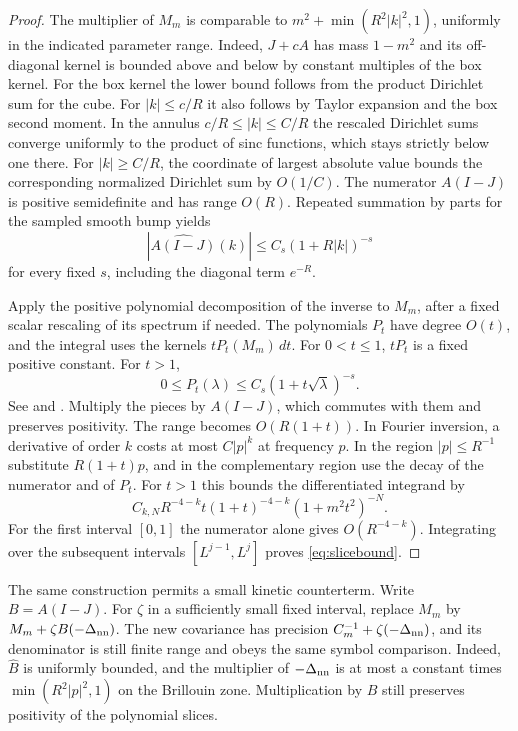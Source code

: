 \documentclass[11pt]{article}
\begin{document}
\begin{proof}
The multiplier of \(M_m\) is comparable to
\(m^2+\min(R^2|k|^2,1)\), uniformly in the indicated parameter range. Indeed, \(J+cA\) has mass \(1-m^2\) and its off-diagonal kernel is bounded above and below by constant multiples of the box kernel. For the box kernel the lower bound follows from the product Dirichlet sum for the cube. For \(|k|\le c/R\) it also follows by Taylor expansion and the box second moment. In the annulus \(c/R\le |k|\le C/R\) the rescaled Dirichlet sums converge uniformly to the product of sinc functions, which stays strictly below one there. For \(|k|\ge C/R\), the coordinate of largest absolute value bounds the corresponding normalized Dirichlet sum by \(O(1/C)\). The numerator \(A(I-J)\) is positive semidefinite and has range \(O(R)\). Repeated summation by parts for the sampled smooth bump yields
\[
 |\widehat{A(I-J)}(k)|\le C_s(1+R|k|)^{-s}
\]
for every fixed \(s\), including the diagonal term \(e^{-R}\).

Apply the positive polynomial decomposition of the inverse to \(M_m\), after a fixed scalar rescaling of its spectrum if needed. The polynomials \(P_t\) have degree \(O(t)\), and the integral uses the kernels \(tP_t(M_m)\,dt\). For \(0<t\le1\), \(tP_t\) is a fixed positive constant. For \(t>1\),
\[
 0\le P_t(\lambda)\le C_s(1+t\sqrt\lambda)^{-s}.
\]
See \cite[Lemma 2.7]{Bauerschmidt} and \cite[Lemma 3.8]{BPR}. Multiply the pieces by \(A(I-J)\), which commutes with them and preserves positivity. The range becomes \(O(R(1+t))\). In Fourier inversion, a derivative of order \(k\) costs at most \(C|p|^k\) at frequency \(p\). In the region \(|p|\le R^{-1}\) substitute \(R(1+t)p\), and in the complementary region use the decay of the numerator and of \(P_t\). For \(t>1\) this bounds the differentiated integrand by
\[
 C_{k,N}R^{-4-k}t(1+t)^{-4-k}(1+m^2t^2)^{-N}.
\]
For the first interval \([0,1]\) the numerator alone gives \(O(R^{-4-k})\). Integrating over the subsequent intervals \([L^{j-1},L^j]\) proves \eqref{eq:slicebound}.
\end{proof}


The same construction permits a small kinetic counterterm. Write
\(B=A(I-J)\). For \(\zeta\) in a sufficiently small fixed interval, replace
\(M_m\) by \(M_m+\zeta B(-\Delta_{\rm nn})\). The new covariance has
precision \(C_m^{-1}+\zeta(-\Delta_{\rm nn})\), and its denominator is
still finite range and obeys the same symbol comparison. Indeed,
\(\widehat B\) is uniformly bounded, and the multiplier of
\(-\Delta_{\rm nn}\) is at most a constant times \(\min(R^2|p|^2,1)\)
on the Brillouin zone. Multiplication by \(B\) still preserves positivity
of the polynomial slices.
\end{document}
